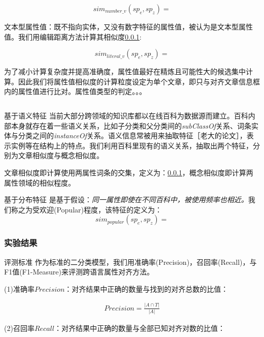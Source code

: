 \begin{equation}
\label{equ:number_value_similarity}
sim_{number\_v}(sp_e, sp_z) =
\end{equation}

文本型属性值：既不指向实体，又没有数字特征的属性值，被认为是文本型属性值。我们用编辑距离方法计算其相似度\ref{}:

\begin{equation}
\label{equ:literal_value_similarity}
sim_{literal\_v}(sp_e, sp_z) =
\end{equation}

为了减小计算复杂度并提高准确度，属性值最好在精炼且可能性大的候选集中计算。因此我们将属性值相似度的计算粒度设定为单个文章，即只与对齐文章信息框内的属性值进行比对。属性值类型的判定。。。

\begin{equation}
\end{equation}

{\heiti 基于语义特征}
当前大部分跨领域的知识库都以在线百科为数据源而建立。百科内部本身就存在着一些语义关系，比如子分类和父分类间的\textit{subClassOf}关系、词条实体与分类之间的\textit{instanceOf}关系。语义信息常被用来抽取特征［老大的论文］，表示实例等在结构上的特点。我们利用百科里现有的语义关系，抽取出两个特征，分别为文章相似度与概念相似度。

文章相似度即计算使用两属性词条的交集，定义为：\ref{}，概念相似度即计算两属性领域的相似程度。

{\heiti 基于分布特征}
是基于假设：\textit{同一属性即使在不同百科中，被使用频率也相近。}我们称之为受欢迎(Popular)程度，该特征的定义为：
\begin{equation}
sim_{popular}(sp_e, sp_z) =
\end{equation}

\subsubsection{实验结果}

{\heiti 评测标准}
作为标准的二分类模型，我们用准确率(Precision)，召回率(Recall)，与F1值(F1-Measure)来评测跨语言属性对齐方法。

(1)准确率$Precision$：对齐结果中正确的数量与找到的对齐总数的比值：

\begin{align}
Precision = \frac { \left| A\cap T \right|  }{ \left| A \right|  } 
\end{align}

(2)召回率$Recall$：对齐结果中正确的数量与全部已知对齐对数的比值：

